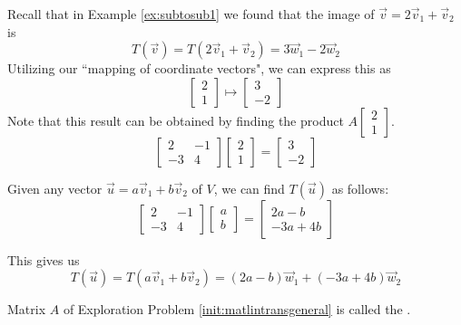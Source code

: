 \documentclass{ximera}
\begin{document}
\begin{initprob}
Recall that in Example \ref{ex:subtosub1} we found that the image of $\vec{v}=2\vec{v}_1+\vec{v}_2$ is $$T(\vec{v})=T(2\vec{v}_1+\vec{v}_2)=3\vec{w}_1-2\vec{w}_2$$
Utilizing our ``mapping of coordinate vectors", we can express this as 
$$\begin{bmatrix}2\\1\end{bmatrix}\mapsto\begin{bmatrix}3\\-2\end{bmatrix}$$
Note that this result can be obtained by finding the product $A\begin{bmatrix}2\\1\end{bmatrix}$.
$$\begin{bmatrix}2&-1\\-3&4\end{bmatrix}\begin{bmatrix}2\\1\end{bmatrix}=\begin{bmatrix}3\\-2\end{bmatrix}$$

Given any vector $\vec{u}=a\vec{v}_1+b\vec{v}_2$ of $V$, we can find $T(\vec{u})$ as follows:
$$\begin{bmatrix}2&-1\\-3&4\end{bmatrix}\begin{bmatrix}a\\b\end{bmatrix}=\begin{bmatrix}2a-b\\-3a+4b\end{bmatrix}$$

This gives us
$$T(\vec{u})=T(a\vec{v}_1+b\vec{v}_2)=(2a-b)\vec{w}_1+(-3a+4b)\vec{w}_2$$

\end{initprob}

Matrix $A$ of Exploration Problem \ref{init:matlintransgeneral} is called the .
\end{document}
